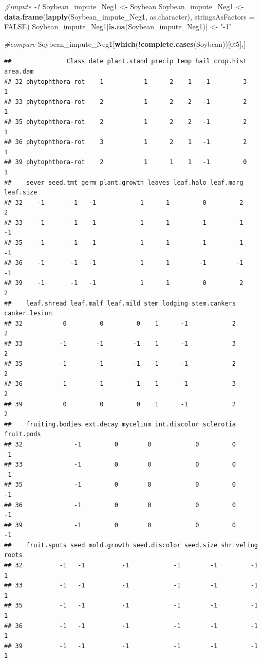 \documentclass[]{book}
\newenvironment{Shaded}{\begin{snugshade}}{\end{snugshade}}
\newcommand{\CommentTok}[1]{\textcolor[rgb]{0.56,0.35,0.01}{\textit{#1}}}
\newcommand{\DataTypeTok}[1]{\textcolor[rgb]{0.13,0.29,0.53}{#1}}
\newcommand{\DecValTok}[1]{\textcolor[rgb]{0.00,0.00,0.81}{#1}}
\newcommand{\KeywordTok}[1]{\textcolor[rgb]{0.13,0.29,0.53}{\textbf{#1}}}
\newcommand{\NormalTok}[1]{#1}
\newcommand{\OperatorTok}[1]{\textcolor[rgb]{0.81,0.36,0.00}{\textbf{#1}}}
\newcommand{\OtherTok}[1]{\textcolor[rgb]{0.56,0.35,0.01}{#1}}
\newcommand{\StringTok}[1]{\textcolor[rgb]{0.31,0.60,0.02}{#1}}
\begin{document}
\begin{Shaded}
\begin{Highlighting}[]
\CommentTok{#impute -1}
\NormalTok{Soybean_impute_Neg1 <-}\StringTok{ }\NormalTok{Soybean}
\NormalTok{Soybean_impute_Neg1 <-}\StringTok{ }\KeywordTok{data.frame}\NormalTok{(}\KeywordTok{lapply}\NormalTok{(Soybean_impute_Neg1, as.character), }\DataTypeTok{stringsAsFactors =} \OtherTok{FALSE}\NormalTok{)}
\NormalTok{Soybean_impute_Neg1[}\KeywordTok{is.na}\NormalTok{(Soybean_impute_Neg1)] <-}\StringTok{ "-1"}

\CommentTok{#compare}
\NormalTok{Soybean_impute_Neg1[}\KeywordTok{which}\NormalTok{(}\OperatorTok{!}\KeywordTok{complete.cases}\NormalTok{(Soybean))[}\DecValTok{0}\OperatorTok{:}\DecValTok{5}\NormalTok{],]}
\end{Highlighting}
\end{Shaded}

\begin{verbatim}
##               Class date plant.stand precip temp hail crop.hist area.dam
## 32 phytophthora-rot    1           1      2    1   -1         3        1
## 33 phytophthora-rot    2           1      2    2   -1         2        1
## 35 phytophthora-rot    2           1      2    2   -1         2        1
## 36 phytophthora-rot    3           1      2    1   -1         2        1
## 39 phytophthora-rot    2           1      1    1   -1         0        1
##    sever seed.tmt germ plant.growth leaves leaf.halo leaf.marg leaf.size
## 32    -1       -1   -1            1      1         0         2         2
## 33    -1       -1   -1            1      1        -1        -1        -1
## 35    -1       -1   -1            1      1        -1        -1        -1
## 36    -1       -1   -1            1      1        -1        -1        -1
## 39    -1       -1   -1            1      1         0         2         2
##    leaf.shread leaf.malf leaf.mild stem lodging stem.cankers canker.lesion
## 32           0         0         0    1      -1            2             2
## 33          -1        -1        -1    1      -1            3             2
## 35          -1        -1        -1    1      -1            2             2
## 36          -1        -1        -1    1      -1            3             2
## 39           0         0         0    1      -1            2             2
##    fruiting.bodies ext.decay mycelium int.discolor sclerotia fruit.pods
## 32              -1         0        0            0         0         -1
## 33              -1         0        0            0         0         -1
## 35              -1         0        0            0         0         -1
## 36              -1         0        0            0         0         -1
## 39              -1         0        0            0         0         -1
##    fruit.spots seed mold.growth seed.discolor seed.size shriveling roots
## 32          -1   -1          -1            -1        -1         -1     1
## 33          -1   -1          -1            -1        -1         -1     1
## 35          -1   -1          -1            -1        -1         -1     1
## 36          -1   -1          -1            -1        -1         -1     1
## 39          -1   -1          -1            -1        -1         -1     1
\end{verbatim}
\end{document}
